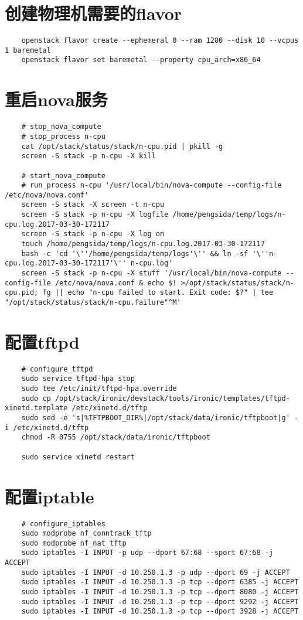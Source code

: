 \documentclass[a4paper,left=2.5cm,right=2.5cm,11pt]{article}
\begin{document}
\section{创建物理机需要的flavor}
	\begin{lstlisting}
	openstack flavor create --ephemeral 0 --ram 1280 --disk 10 --vcpus 1 baremetal
	openstack flavor set baremetal --property cpu_arch=x86_64	
	\end{lstlisting}

\section{重启nova服务}
	\begin{lstlisting}
	# stop_nova_compute
	# stop_process n-cpu
	cat /opt/stack/status/stack/n-cpu.pid | pkill -g
	screen -S stack -p n-cpu -X kill
	
	# start_nova_compute
	# run_process n-cpu '/usr/local/bin/nova-compute --config-file /etc/nova/nova.conf'
	screen -S stack -X screen -t n-cpu
	screen -S stack -p n-cpu -X logfile /home/pengsida/temp/logs/n-cpu.log.2017-03-30-172117
	screen -S stack -p n-cpu -X log on
	touch /home/pengsida/temp/logs/n-cpu.log.2017-03-30-172117
	bash -c 'cd '\''/home/pengsida/temp/logs'\'' && ln -sf '\''n-cpu.log.2017-03-30-172117'\'' n-cpu.log'
	screen -S stack -p n-cpu -X stuff '/usr/local/bin/nova-compute --config-file /etc/nova/nova.conf & echo $! >/opt/stack/status/stack/n-cpu.pid; fg || echo "n-cpu failed to start. Exit code: $?" | tee "/opt/stack/status/stack/n-cpu.failure"^M'	
	\end{lstlisting}

\section{配置tftpd}
	\begin{lstlisting}
	# configure_tftpd
	sudo service tftpd-hpa stop
	sudo tee /etc/init/tftpd-hpa.override
	sudo cp /opt/stack/ironic/devstack/tools/ironic/templates/tftpd-xinetd.template /etc/xinetd.d/tftp
	sudo sed -e 's|%TFTPBOOT_DIR%|/opt/stack/data/ironic/tftpboot|g' -i /etc/xinetd.d/tftp
	chmod -R 0755 /opt/stack/data/ironic/tftpboot
	
	sudo service xinetd restart
	\end{lstlisting}

\section{配置iptable}
	\begin{lstlisting}
	# configure_iptables
	sudo modprobe nf_conntrack_tftp
	sudo modprobe nf_nat_tftp
	sudo iptables -I INPUT -p udp --dport 67:68 --sport 67:68 -j ACCEPT
	sudo iptables -I INPUT -d 10.250.1.3 -p udp --dport 69 -j ACCEPT
	sudo iptables -I INPUT -d 10.250.1.3 -p tcp --dport 6385 -j ACCEPT
	sudo iptables -I INPUT -d 10.250.1.3 -p tcp --dport 8080 -j ACCEPT
	sudo iptables -I INPUT -d 10.250.1.3 -p tcp --dport 9292 -j ACCEPT
	sudo iptables -I INPUT -d 10.250.1.3 -p tcp --dport 3928 -j ACCEPT
	\end{lstlisting}
	
\end{document}
